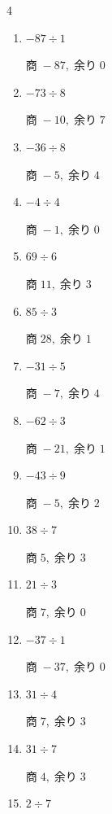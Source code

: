 \begin{multicols}{4}
\begin{enumerate}
        $商\; -3,\; 余り\; 6$

  \item $-87 \div 1$

        $商\; -87,\; 余り\; 0$

  \item $-73 \div 8$

        $商\; -10,\; 余り\; 7$

  \item $-36 \div 8$

        $商\; -5,\; 余り\; 4$

  \item $-4 \div 4$

        $商\; -1,\; 余り\; 0$

  \item $69 \div 6$

        $商\; 11,\; 余り\; 3$

  \item $85 \div 3$

        $商\; 28,\; 余り\; 1$

  \item $-31 \div 5$

        $商\; -7,\; 余り\; 4$

\columnbreak %

  \item $-62 \div 3$

        $商\; -21,\; 余り\; 1$

  \item $-43 \div 9$

        $商\; -5,\; 余り\; 2$

  \item $38 \div 7$

        $商\; 5,\; 余り\; 3$

  \item $21 \div 3$

        $商\; 7,\; 余り\; 0$

  \item $-37 \div 1$

        $商\; -37,\; 余り\; 0$

  \item $31 \div 4$

        $商\; 7,\; 余り\; 3$

  \item $31 \div 7$

        $商\; 4,\; 余り\; 3$

  \item $2 \div 7$


\end{enumerate}
\end{multicols}
